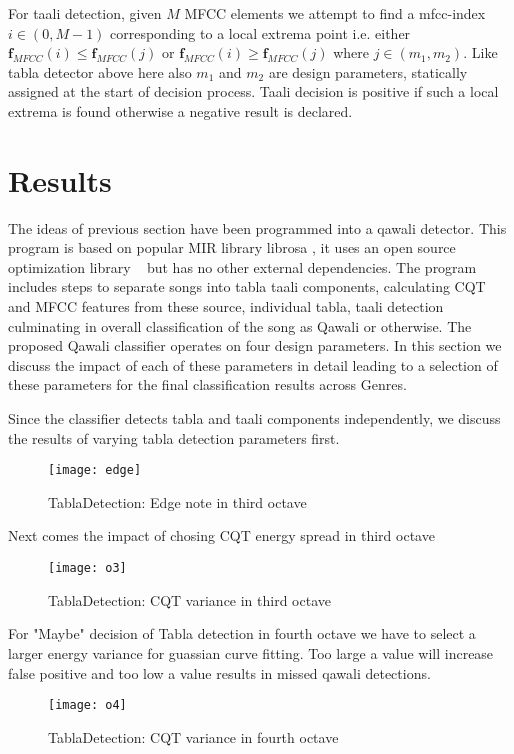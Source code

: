 \documentclass{article}
\begin{document}
For taali detection, given $M$ MFCC elements we attempt to find a mfcc-index $i \in (0, M-1)$ corresponding to a local extrema point i.e. either $\boldsymbol{f}_{MFCC}(i) \leq \boldsymbol{f}_{MFCC}(j)$ or $\boldsymbol{f}_{MFCC}(i) \geq \boldsymbol{f}_{MFCC}(j)$ where $j \in (m_{1}, m_{2})$. Like tabla detector above here also $m_{1}$ and $m_{2}$ are design parameters, statically assigned at the start of decision process. Taali decision is positive if such a local extrema is found otherwise a negative result is declared.

\section{Results}\label{sec:result}

The ideas of previous section have been programmed into a qawali detector. This program is based on popular MIR library librosa  \citep{brian_mcfee_2022_6097378}, it uses an open source optimization library ~\citep{newville_matthew_2014} but has no other external dependencies. The program includes steps to separate songs into tabla taali components, calculating CQT and MFCC features from these source, individual tabla, taali detection culminating in overall classification of the song as Qawali or otherwise. The proposed Qawali classifier operates on four design parameters. In this section we discuss the impact of each of these parameters in detail leading to a selection of these parameters for the final classification results across Genres.

Since the classifier detects tabla and taali components independently, we discuss the results of varying tabla detection parameters first.
\begin{figure}[htbp]
  \centering
  \texttt{[image: edge]}
  \caption{TablaDetection: Edge note in third octave}
\label{fig:src_edge}
\end{figure}

Next comes the impact of chosing CQT energy spread in third octave
\begin{figure}[htbp]
  \centering
  \texttt{[image: o3]}
  \caption{TablaDetection: CQT variance in third octave}
\label{fig:src_o3}
\end{figure}


For "Maybe" decision of Tabla detection in fourth octave we have to select a larger energy variance for guassian curve fitting. Too large a value will increase false positive and too low a value results in missed qawali detections.
\begin{figure}[htbp]
  \centering
  \texttt{[image: o4]}
  \caption{TablaDetection: CQT variance in fourth octave}
\label{fig:src_o4}
\end{figure}
\end{document}
